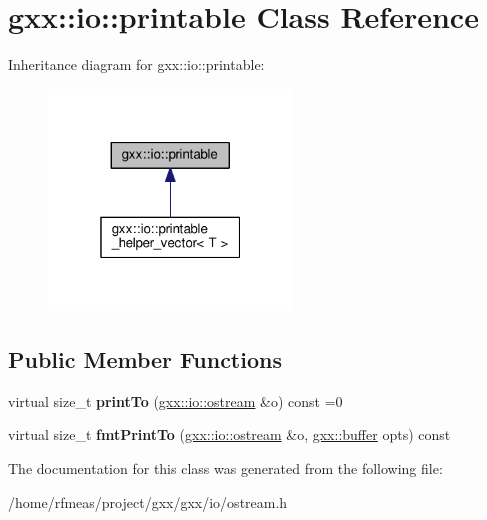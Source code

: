 \hypertarget{classgxx_1_1io_1_1printable}{}\section{gxx\+:\+:io\+:\+:printable Class Reference}
\label{classgxx_1_1io_1_1printable}


Inheritance diagram for gxx\+:\+:io\+:\+:printable\+:
\nopagebreak
\begin{figure}[H]
\begin{center}
\leavevmode
\includegraphics[width=184pt]{classgxx_1_1io_1_1printable__inherit__graph}
\end{center}
\end{figure}
\subsection*{Public Member Functions}
\begin{DoxyCompactItemize}
\item 
virtual size\+\_\+t {\bfseries print\+To} (\hyperlink{classgxx_1_1io_1_1ostream}{gxx\+::io\+::ostream} \&o) const =0\hypertarget{classgxx_1_1io_1_1printable_a0bfddbbbdfd00b72283f6ba11f7b979d}{}\label{classgxx_1_1io_1_1printable_a0bfddbbbdfd00b72283f6ba11f7b979d}

\item 
virtual size\+\_\+t {\bfseries fmt\+Print\+To} (\hyperlink{classgxx_1_1io_1_1ostream}{gxx\+::io\+::ostream} \&o, \hyperlink{classgxx_1_1buffer}{gxx\+::buffer} opts) const \hypertarget{classgxx_1_1io_1_1printable_ab1c5950c1fb90f37117ffef595230768}{}\label{classgxx_1_1io_1_1printable_ab1c5950c1fb90f37117ffef595230768}

\end{DoxyCompactItemize}


The documentation for this class was generated from the following file\+:\begin{DoxyCompactItemize}
\item 
/home/rfmeas/project/gxx/gxx/io/ostream.\+h\end{DoxyCompactItemize}
